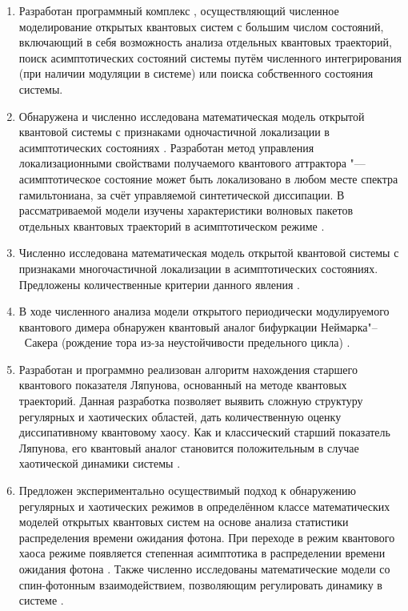 \begin{enumerate}[beginpenalty=10000] %
	\item Разработан программный комплекс \cite{prog1}, осуществляющий численное моделирование открытых квантовых систем с большим числом состояний, включающий в себя возможность анализа отдельных квантовых траекторий, поиск асимптотических состояний системы путём численного интегрирования (при наличии модуляции в системе) или поиска собственного состояния системы.
	\item Обнаружена и численно исследована математическая модель открытой квантовой системы с признаками одночастичной локализации в асимптотических состояниях \cite{Yusipov2017}. 
	Разработан метод управления локализационными свойствами получаемого квантового аттрактора \cite{Vershinina2017} "--- асимптотическое состояние может быть локализовано в любом месте спектра гамильтониана, за счёт управляемой синтетической диссипации.
	В рассматриваемой модели изучены характеристики волновых пакетов отдельных квантовых траекторий в асимптотическом режиме \cite{Yusipov2018}.
	\item Численно исследована математическая модель открытой квантовой системы с признаками многочастичной локализации в асимптотических состояниях. Предложены количественные критерии данного явления \cite{Vakulchyk2018}.
	\item В ходе численного анализа модели открытого периодически модулируемого квантового димера обнаружен квантовый аналог бифуркации Неймарка"--~Сакера (рождение тора из-за неустойчивости предельного цикла) \cite{Yusipov2019_1}.
	\item Разработан и программно реализован \cite{prog1} алгоритм нахождения старшего квантового показателя Ляпунова, основанный на методе квантовых траекторий. Данная разработка позволяет выявить сложную структуру регулярных и хаотических областей, дать количественную оценку диссипативному квантовому хаосу. Как и классический старший показатель Ляпунова, его квантовый аналог становится положительным в случае хаотической динамики системы \cite{Yusipov2019_2}.
	\item Предложен экспериментально осуществимый подход к обнаружению регулярных и хаотических режимов в определённом классе математических моделей открытых квантовых систем на основе анализа статистики распределения времени ожидания фотона. При переходе в режим квантового хаоса режиме появляется степенная асимптотика в распределении времени ожидания фотона \cite{Yusipov2020}. Также численно исследованы математические модели со спин-фотонным взаимодействием, позволяющим регулировать динамику в системе \cite{Yusipov2021}.
\end{enumerate}
